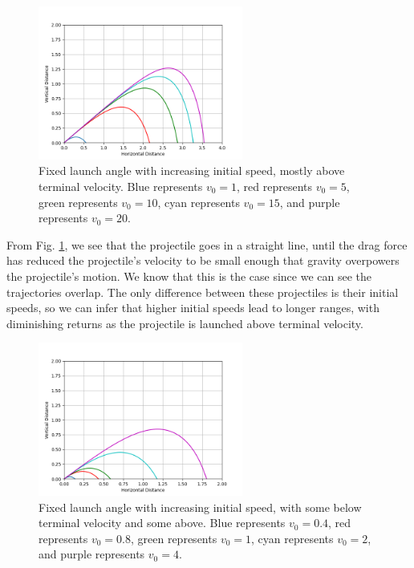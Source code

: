 \documentclass[12pt]{iopart} %
\begin{document}
\begin{figure}[h!tbp]
  \begin{center}
 \item[]\includegraphics[width=0.6\textwidth]{figure10.png}
  \caption{\label{fig:figure10}
  Fixed launch angle with increasing initial speed, mostly above terminal velocity. Blue represents $v_0 = 1$, red represents $v_0 = 5$, green represents $v_0 = 10$, cyan represents $v_0 = 15$, and purple represents $v_0 = 20$.
  }
  \end{center}
\end{figure}

From Fig. \ref{fig:figure10}, we see that the projectile goes in a straight line, until the drag force has reduced the projectile's velocity to be small enough that gravity overpowers the projectile's motion. 
We know that this is the case since we can see the trajectories overlap. 
The only difference between these projectiles is their initial speeds, so we can infer that higher initial speeds lead to longer ranges, with diminishing returns as the projectile is launched above terminal velocity. 

\begin{figure}[h!tbp]
  \begin{center}
 \item[]\includegraphics[width=0.6\textwidth]{figure11.png}
  \caption{\label{fig:figure11}
  Fixed launch angle with increasing initial speed, with some below terminal velocity and some above. Blue represents $v_0 = 0.4$, red represents $v_0 = 0.8$, green represents $v_0 = 1$, cyan represents $v_0 = 2$, and purple represents $v_0 = 4$.
  }
  \end{center}
\end{figure}
\end{document}
